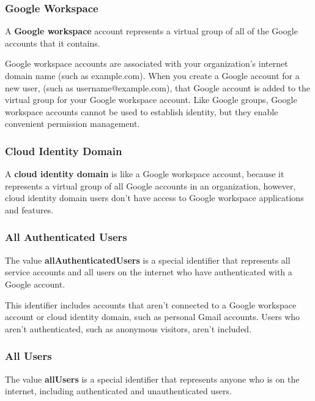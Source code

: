 \subsubsection*{Google Workspace}

A \textbf{Google workspace} account represents a virtual group of all of the Google accounts that it contains.
\ed

Google workspace accounts are associated with your organization's internet domain name (such as example.com). When
you create a Google account for a new user, (such as username@example.com), that Google account is added to the
virtual group for your Google workspace account. Like Google groups, Google workspace accounts cannot be used to
establish identity, but they enable convenient permission management.

\subsubsection*{Cloud Identity Domain}

A \textbf{cloud identity domain} is like a Google workspace account, because it represents a virtual group of all Google
accounts in an organization, however, cloud identity domain users don't have access to Google workspace applications
and features.
\ed

\subsubsection*{All Authenticated Users}

The value \textbf{allAuthenticatedUsers} is a special identifier that represents all service accounts and all users on
the internet who have authenticated with a Google account.
\ed

This identifier includes accounts that aren't connected to a Google workspace account or cloud identity domain, such
as personal Gmail accounts. Users who aren't authenticated, such as anonymous visitors, aren't included.

\subsubsection*{All Users}

The value \textbf{allUsers} is a special identifier that represents anyone who is on the internet, including
authenticated and unauthenticated users.
\ed

